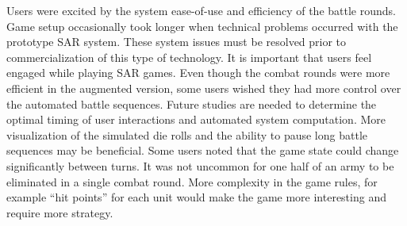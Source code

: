 Users were excited by the system ease-of-use and efficiency 
of the battle rounds.
Game setup 
occasionally 
took longer when technical problems occurred
with the prototype SAR system.  These system issues must be resolved
prior to commercialization of this type of technology.
It is important that users feel engaged while 
playing SAR games.
Even though the combat rounds were more efficient in
the augmented version,
some users wished they had more control over the automated battle
sequences.
Future studies are needed to determine
the optimal timing of user interactions and automated system computation.
More visualization of the simulated die rolls and the ability to pause
long battle sequences may be beneficial.  Some users noted that the
game state could change significantly between turns.  It was not
uncommon for one half of an army to be eliminated in a single 
combat round.  More complexity in the game rules, for example ``hit points'' for each unit
would make the game more interesting and require more strategy.





